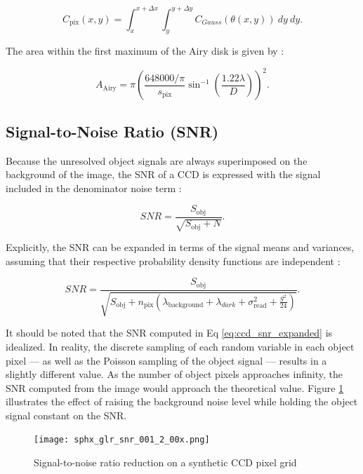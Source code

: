 \begin{equation} \label{eq:pix_values_gauss}
  C_\mathrm{pix}(x, y) = \int_{x}^{x + \Delta x} \int_{y}^{y + \Delta y}{C_{Gauss}(\theta(x, y))} \: dy \: dy.
\end{equation}

The area within the first maximum of the Airy disk is given by \cite{frueh2019notes}:

\begin{equation} \label{eq:airy_area}
  A_\mathrm{Airy} = \pi \left(\frac{648000 / \pi}{s_\mathrm{pix}} \sin^{-1}\left(\frac{1.22 \lambda}{D}\right) \right)^2.
\end{equation}

\subsection{Signal-to-Noise Ratio (SNR)}

Because the unresolved object signals are always superimposed on the background of the image, the SNR of a CCD is expressed with the signal included in the denominator noise term \cite{frueh2019notes}:

\begin{equation} \label{eq:ccd_snr}
  SNR = \frac{S_\mathrm{obj}}{\sqrt{S_\mathrm{obj}+N}}.
\end{equation}

Explicitly, the SNR can be expanded in terms of the signal means and variances, assuming that their respective probability density functions are independent \cite{frueh2019notes}:

\begin{equation} \label{eq:ccd_snr_expanded}
  SNR = \frac{S_\mathrm{obj}}{\sqrt{S_\mathrm{obj} + n_\mathrm{pix} \left( \lambda_\mathrm{background} + \lambda_{dark} + \sigma^2_\mathrm{read} + \frac{g^2}{24} \right)}}.
\end{equation}

It should be noted that the SNR computed in Eq \ref{eq:ccd_snr_expanded} is idealized. In reality, the discrete sampling of each random variable in each object pixel --- as well as the Poisson sampling of the object signal --- results in a slightly different value. As the number of object pixels approaches infinity, the SNR computed from the image would approach the theoretical value. Figure \ref{fig:snr_grid} illustrates the effect of raising the background noise level while holding the object signal constant on the SNR.

\begin{figure}[ht]
  \centering
  \texttt{[image: sphx\_glr\_snr\_001\_2\_00x.png]}
  \caption{Signal-to-noise ratio reduction on a synthetic CCD pixel grid}
  \label{fig:snr_grid}
\end{figure}

